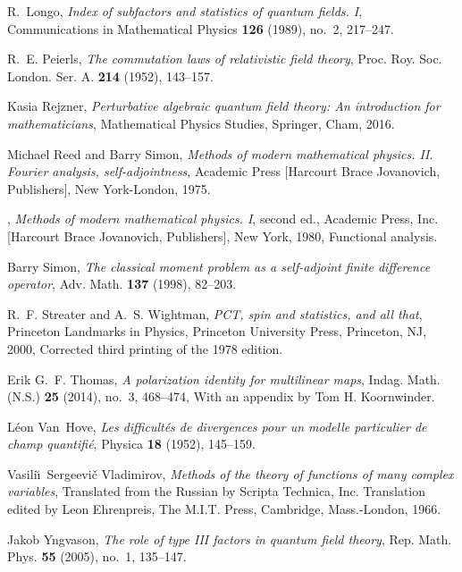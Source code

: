 \documentclass[12pt]{article}
\newcommand{\1}{\mathds{1}}                         %
\begin{document}
{\begin{thebibliography}{BDFY15}
	R.~Longo, \emph{Index of subfactors and statistics of quantum fields. {I}},
	Communications in Mathematical Physics \textbf{126} (1989), no.~2, 217--247.
	
	R.~E. Peierls, \emph{The commutation laws of relativistic field theory}, Proc.
	Roy. Soc. London. Ser. A. \textbf{214} (1952), 143--157. 
	
	Kasia Rejzner, \emph{Perturbative algebraic quantum field theory: An
		introduction for mathematicians}, Mathematical Physics Studies, Springer,
	Cham, 2016. 
	
	Michael Reed and Barry Simon, \emph{Methods of modern mathematical physics.
		{II}. {F}ourier analysis, self-adjointness}, Academic Press [Harcourt Brace
	Jovanovich, Publishers], New York-London, 1975. 
	
	\bysame, \emph{Methods of modern mathematical physics. {I}}, second ed.,
	Academic Press, Inc. [Harcourt Brace Jovanovich, Publishers], New York, 1980,
	Functional analysis. 
	
	Barry Simon, \emph{The classical moment problem as a self-adjoint finite
		difference operator}, Adv. Math. \textbf{137} (1998), 82--203.
	
	R.~F. Streater and A.~S. Wightman, \emph{P{CT}, spin and statistics, and all
		that}, Princeton Landmarks in Physics, Princeton University Press, Princeton,
	NJ, 2000, Corrected third printing of the 1978 edition. 
	
	Erik G.~F. Thomas, \emph{A polarization identity for multilinear maps}, Indag.
	Math. (N.S.) \textbf{25} (2014), no.~3, 468--474, With an appendix by Tom H.
	Koornwinder. 
	
	L\'{e}on Van~Hove, \emph{Les difficult\'{e}s de divergences pour un modelle
		particulier de champ quantifi\'{e}}, Physica \textbf{18} (1952), 145--159.
	
	Vasili\u{\i}~Sergeevi\v{c} Vladimirov, \emph{Methods of the theory of functions
		of many complex variables}, Translated from the Russian by Scripta Technica,
	Inc. Translation edited by Leon Ehrenpreis, The M.I.T. Press, Cambridge,
	Mass.-London, 1966. 
	
	Jakob Yngvason, \emph{The role of type {III} factors in quantum field theory},
	Rep. Math. Phys. \textbf{55} (2005), no.~1, 135--147. 
	

\end{thebibliography}}
\end{document}
